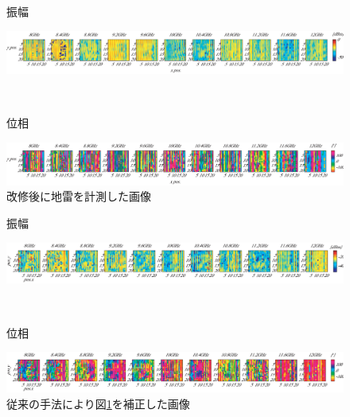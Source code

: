 ﻿\documentclass[12pt,oneside]{jsbook}
\begin{document}
\begin{figure}[ht]
 \begin{center}
     \begin{minipage}[c]{0.05\hsize}
振幅
  \end{minipage}
     \begin{minipage}[c]{0.94\hsize}
\includegraphics[width = \hsize ]{mine1_amp_raw.eps}
  \end{minipage}
\\
     \begin{minipage}[c]{0.05\hsize}
位相
  \end{minipage}
     \begin{minipage}[c]{0.94\hsize}
\includegraphics[width =\hsize ]{mine1_phs_raw.eps}
  \end{minipage}
\caption{改修後に地雷を計測した画像}
\label{newmine}
 \end{center}
\end{figure}

\begin{figure}[ht]
 \begin{center}
     \begin{minipage}[c]{0.05\hsize}
振幅
  \end{minipage}
     \begin{minipage}[c]{0.94\hsize}
\includegraphics[width = \hsize ]{mine_hosei_old_amp.eps}
  \end{minipage}
\\
     \begin{minipage}[c]{0.05\hsize}
位相
  \end{minipage}
     \begin{minipage}[c]{0.94\hsize}
\includegraphics[width =\hsize ]{mine_hosei_old_phs.eps}
  \end{minipage}
\caption{従来の手法により図\ref{newmine}を補正した画像}
\label{newmine_hosei_old}
 \end{center}
\end{figure}
\end{document}

